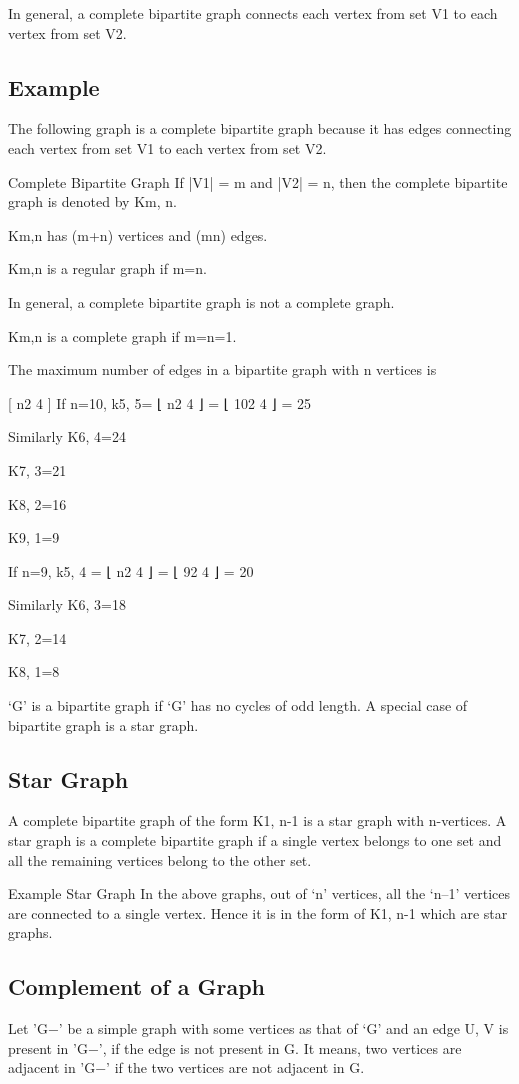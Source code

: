 In general, a complete bipartite graph connects each vertex from set V1 to each vertex from set V2.

\subsection{Example}
The following graph is a complete bipartite graph because it has edges connecting each vertex from set V1 to each vertex from set V2.

Complete Bipartite Graph
If |V1| = m and |V2| = n, then the complete bipartite graph is denoted by Km, n.

Km,n has (m+n) vertices and (mn) edges.

Km,n is a regular graph if m=n.

In general, a complete bipartite graph is not a complete graph.

Km,n is a complete graph if m=n=1.

The maximum number of edges in a bipartite graph with n vertices is

[
n2
4
]
If n=10, k5, 5= ⌊
n2
4
⌋ = ⌊
102
4
⌋ = 25

Similarly K6, 4=24

K7, 3=21

K8, 2=16

K9, 1=9

If n=9, k5, 4 = ⌊
n2
4
⌋ = ⌊
92
4
⌋ = 20

Similarly K6, 3=18

K7, 2=14

K8, 1=8

‘G’ is a bipartite graph if ‘G’ has no cycles of odd length. A special case of bipartite graph is a star graph.

\subsection{Star Graph}
A complete bipartite graph of the form K1, n-1 is a star graph with n-vertices. A star graph is a complete bipartite graph if a single vertex belongs to one set and all the remaining vertices belong to the other set.

Example
Star Graph
In the above graphs, out of ‘n’ vertices, all the ‘n–1’ vertices are connected to a single vertex. Hence it is in the form of K1, n-1 which are star graphs.

\subsection{Complement of a Graph}
Let 'G−' be a simple graph with some vertices as that of ‘G’ and an edge {U, V} is present in 'G−', if the edge is not present in G. It means, two vertices are adjacent in 'G−' if the two vertices are not adjacent in G.


